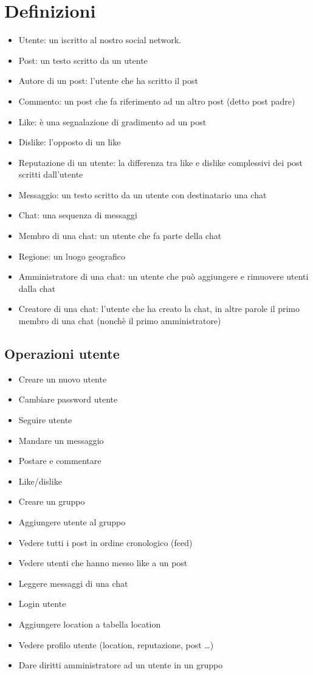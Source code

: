 \documentclass[a4paper,12pt]{report}
\begin{document}
\section{Definizioni}
\begin{itemize}
    \item Utente: un iscritto al nostro social network.  
    \item Post: un testo scritto da un utente 
    \item Autore di un post: l'utente che ha scritto il post
    \item Commento: un post che fa riferimento ad un altro post (detto post padre)
    \item Like: è una segnalazione di gradimento ad un post
    \item Dislike: l'opposto di un like
    \item Reputazione di un utente: la differenza tra like e dislike complessivi dei post scritti dall'utente
    \item Messaggio: un testo scritto da un utente con destinatario una chat 
    \item Chat: una sequenza di messaggi
    \item Membro di una chat: un utente che fa parte della chat  
    \item Regione: un luogo geografico
    \item Amministratore di una chat: un utente che può aggiungere e rimuovere utenti dalla chat
    \item Creatore di una chat: l'utente che ha creato la chat, in altre parole il primo membro di una chat (nonchè il primo amministratore)
\end{itemize}


\subsection{Operazioni utente}
\begin{itemize}
    \item Creare un nuovo utente
    \item Cambiare password utente
    \item Seguire utente
    \item Mandare un messaggio
    \item Postare e commentare
    \item Like/dislike
    \item Creare un gruppo
    \item Aggiungere utente al gruppo
    \item Vedere tutti i post in ordine cronologico (feed)
    \item Vedere utenti che hanno messo like a un post
    \item Leggere messaggi di una chat
    \item Login utente
    \item Aggiungere location a tabella location
    \item Vedere profilo utente (location, reputazione, post \ldots)
    \item Dare diritti amministratore ad un utente in un gruppo
\end{itemize}
\end{document}

